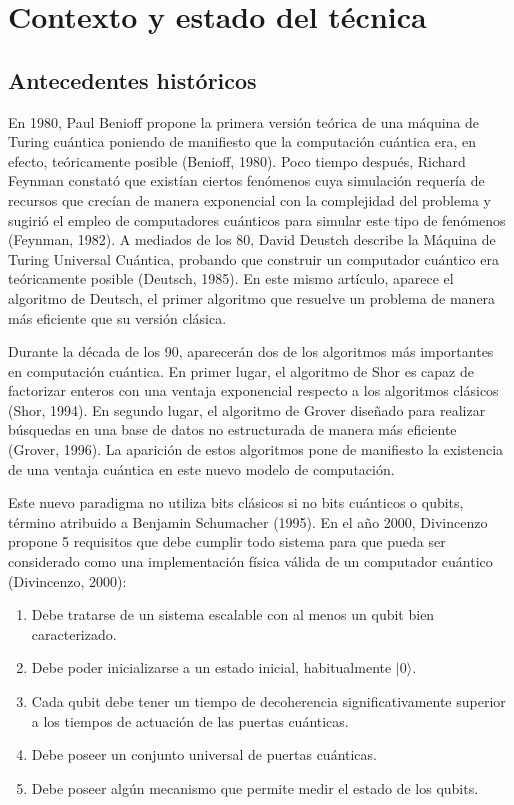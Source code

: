 \chapter{Contexto y estado del técnica}

\section{Antecedentes históricos}

En 1980, Paul Benioff propone la primera versión teórica de una máquina de Turing cuántica poniendo de manifiesto que la computación cuántica era, en efecto, teóricamente posible (Benioff, 1980). Poco tiempo después, Richard Feynman constató que existían ciertos fenómenos cuya simulación requería de recursos que crecían de manera exponencial con la complejidad del problema y sugirió el empleo de computadores cuánticos para simular este tipo de fenómenos (Feynman, 1982). A mediados de los 80, David Deustch describe la Máquina de Turing Universal Cuántica, probando que construir un computador cuántico era teóricamente posible (Deutsch, 1985). En este mismo artículo, aparece el algoritmo de Deutsch, el primer algoritmo que resuelve un problema de manera más eficiente que su versión clásica.

Durante la década de los 90, aparecerán dos de los algoritmos más importantes en computación cuántica. En primer lugar, el algoritmo de Shor es capaz de factorizar enteros con una ventaja exponencial respecto a los algoritmos clásicos (Shor, 1994). En segundo lugar, el algoritmo de Grover diseñado para realizar búsquedas en una base de datos no estructurada de manera más eficiente (Grover, 1996). La aparición de estos algoritmos pone de manifiesto la existencia de una ventaja cuántica en este nuevo modelo de computación.

Este nuevo paradigma no utiliza bits clásicos  si no bits cuánticos o qubits, término atribuido a Benjamin Schumacher (1995). En el año 2000, Divincenzo propone 5 requisitos que debe cumplir todo sistema para que pueda ser considerado como una implementación física válida de un computador cuántico (Divincenzo, 2000):

\begin{enumerate}
    \item Debe tratarse de un sistema escalable con al menos un qubit bien caracterizado.
    \item Debe poder inicializarse a un estado inicial, habitualmente 
    $ | 0 \rangle $.
    \item Cada qubit debe tener un tiempo de decoherencia significativamente superior a los tiempos de actuación de las puertas cuánticas.
    \item Debe poseer un conjunto universal de puertas cuánticas.
    \item Debe poseer algún mecanismo que permite medir el estado de los qubits.
\end{enumerate}










